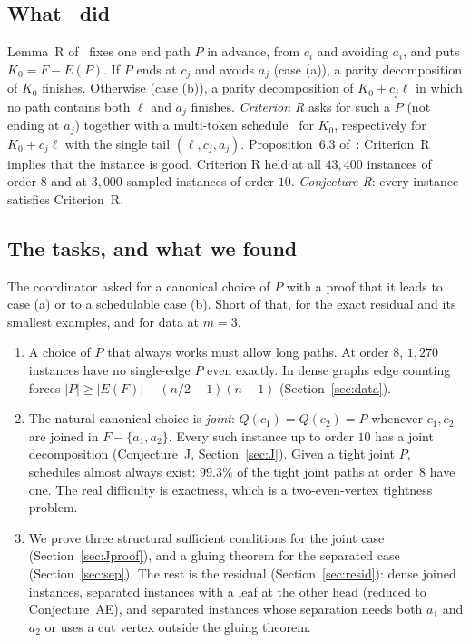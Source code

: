 \documentclass[11pt]{amsart}
\theoremstyle{definition}
\begin{document}
\subsection*{What~\cite{LN} did}
Lemma~R of~\cite{LN} fixes one end path $P$ in advance, from $c_i$ and avoiding $a_i$, and puts
$K_0=F-E(P)$. If $P$ ends at $c_j$ and avoids $a_j$ (case (a)), a parity decomposition of $K_0$ finishes. Otherwise
(case (b)), a parity decomposition of $K_0+c_j\ell$ in which no path contains both $\ell$ and $a_j$ finishes. \emph{Criterion R}
asks for such a $P$ (not ending at $a_j$) together with a multi-token schedule~\cite{MT} for $K_0$,
respectively for $K_0+c_j\ell$ with the single tail $(\ell,c_j,a_j)$. Proposition~6.3 of~\cite{LN}: Criterion~R
implies that the instance is good. Criterion R held at all $43{,}400$ instances of order $8$ and at
$3{,}000$ sampled instances of order $10$. \emph{Conjecture R}: every instance satisfies Criterion~R.

\subsection*{The tasks, and what we found}
The coordinator asked for a canonical choice of $P$ with a proof that it leads to case (a) or to a
schedulable case (b). Short of that, for the exact residual and its smallest examples, and for data at $m=3$.
\begin{enumerate}
\item A choice of $P$ that always works must allow long paths. At order $8$, $1{,}270$ instances have
no single-edge $P$ even exactly. In dense graphs edge counting forces
$|P|\ge|E(F)|-(n/2-1)(n-1)$ (Section~\ref{sec:data}).
\item The natural canonical choice is \emph{joint}: $Q(c_1)=Q(c_2)=P$ whenever $c_1,c_2$ are joined
in $F-\{a_1,a_2\}$. Every such instance up to order $10$ has a joint decomposition (Conjecture~J,
Section~\ref{sec:J}). Given a tight joint $P$, schedules almost always exist: $99.3\%$ of the tight joint paths at order~$8$ have one.
The real difficulty is exactness, which is a two-even-vertex tightness problem.
\item We prove three structural sufficient conditions for the joint case (Section~\ref{sec:Jproof}),
and a gluing theorem for the separated case (Section~\ref{sec:sep}). The rest is the residual
(Section~\ref{sec:resid}): dense joined instances, separated instances with a leaf at the other
head (reduced to Conjecture~AE), and separated instances whose separation needs both $a_1$ and
$a_2$ or uses a cut vertex outside the gluing theorem.
\end{enumerate}
\end{document}
